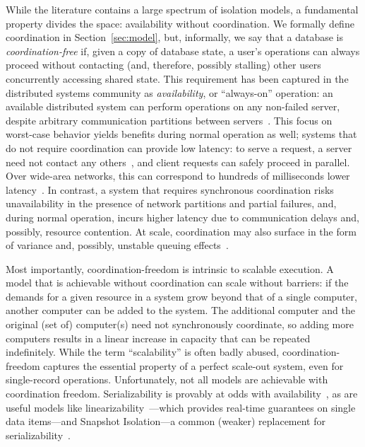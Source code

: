  While the literature contains
a large spectrum of isolation models, a fundamental property divides
the space: availability without coordination. We formally define
coordination in Section~\ref{sec:model}, but, informally, we say that
a database is \textit{coordination-free} if, given a copy of database
state, a user's operations can always proceed without contacting (and,
therefore, possibly stalling) other users concurrently accessing
shared state. This requirement has been captured in the distributed
systems community as \textit{availability}, or ``always-on''
operation: an available distributed system can perform operations on
any non-failed server, despite arbitrary communication partitions
between servers~\cite{gilbert-cap}. This focus on worst-case behavior
yields benefits during normal operation as well; systems that do not
require coordination can provide low latency: to serve a request, a
server need not contact any others~\cite{pacelc}, and client requests
can safely proceed in parallel. Over wide-area networks, this can
correspond to hundreds of milliseconds lower
latency~\cite{hat-vldb}. In contrast, a system that requires
synchronous coordination risks unavailability in the presence of
network partitions and partial failures, and, during normal operation,
incurs higher latency due to communication delays and, possibly,
resource contention. At scale, coordination may also surface in the
form of variance and, possibly, unstable queuing effects~\cite{ladis}.



Most importantly, coordination-freedom is intrinsic to scalable
execution. A model that is achievable without coordination can scale
without barriers: if the demands for a given resource in a system grow
beyond that of a single computer, another computer can be added to the
system. The additional computer and the original (set of) computer(s)
need not synchronously coordinate, so adding more computers results in
a linear increase in capacity that can be repeated indefinitely. While
the term ``scalability'' is often badly abused, coordination-freedom
captures the essential property of a perfect scale-out system, even
for single-record operations.  Unfortunately, not all models are
achievable with coordination freedom. Serializability is provably at
odds with availability~\cite{davidson-survey}, as are useful models
like linearizability~\cite{gilbert-cap}---which provides real-time
guarantees on single data items---and Snapshot Isolation---a common
(weaker) replacement for serializability~\cite{hat-vldb}.

